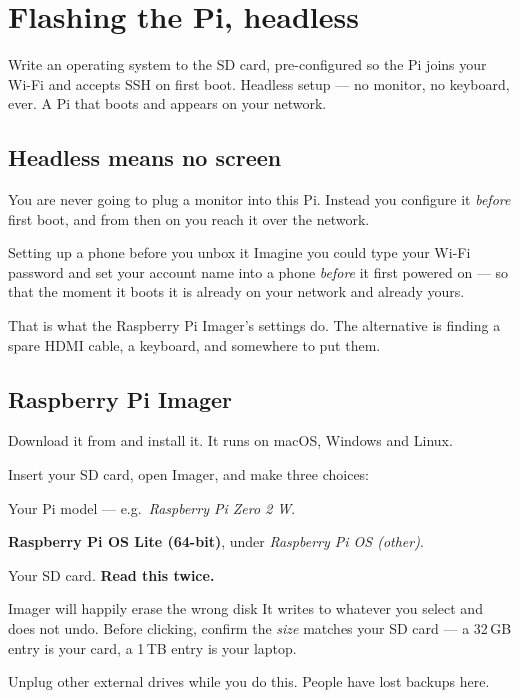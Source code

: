 \chapter{Flashing the Pi, headless}
\label{ch:flashing}

\chapterbrief
  {Write an operating system to the SD card, pre-configured so the Pi joins your Wi-Fi and accepts SSH on first boot.}
  {Headless setup --- no monitor, no keyboard, ever.}
  {A Pi that boots and appears on your network.}

\section{Headless means no screen}

You are never going to plug a monitor into this Pi. Instead you configure it
\emph{before} first boot, and from then on you reach it over the network.

\begin{analogy}{Setting up a phone before you unbox it}
Imagine you could type your Wi-Fi password and set your account name into a
phone \emph{before} it first powered on --- so that the moment it boots it is
already on your network and already yours.

That is what the Raspberry Pi Imager's settings do. The alternative is finding a
spare HDMI cable, a keyboard, and somewhere to put them.
\end{analogy}

\section{Raspberry Pi Imager}

Download it from  and install it. It runs on
macOS, Windows and Linux.

Insert your SD card, open Imager, and make three choices:

\begin{description}[leftmargin=0pt, style=nextline]
  \item[Device] Your Pi model --- e.g.\ \emph{Raspberry Pi Zero 2 W}.
  \item[Operating System] \textbf{Raspberry Pi OS Lite (64-bit)}, under
        \emph{Raspberry Pi OS (other)}.
  \item[Storage] Your SD card. \textbf{Read this twice.}
\end{description}

\begin{trap}{Imager will happily erase the wrong disk}
It writes to whatever you select and does not undo. Before clicking, confirm the
\emph{size} matches your SD card --- a 32\,GB entry is your card, a 1\,TB entry
is your laptop.

Unplug other external drives while you do this. People have lost backups here.
\end{trap}

